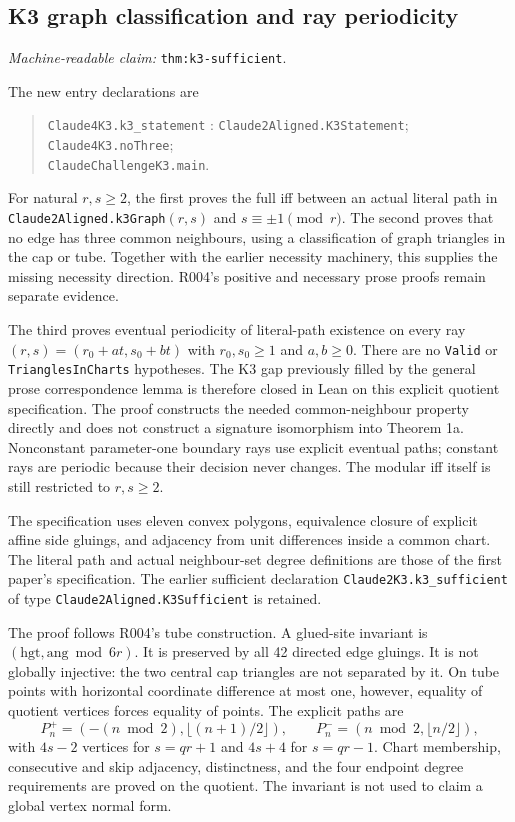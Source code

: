\documentclass[11pt]{amsart}
\newcommand{\record}[1]{\nolinkurl{#1}}
\newcommand{\claimid}[1]{\par\nopagebreak\noindent\textit{Machine-readable claim:} \record{#1}.\par}
\theoremstyle{definition}\newtheorem{definition}{Definition}
\begin{document}
\subsection{K3 graph classification and ray periodicity}\label{thm:k3-sufficient}
\claimid{thm:k3-sufficient}
The new entry declarations are
\begin{quote}\small\noindent
\record{Claude4K3.k3_statement} : \record{Claude2Aligned.K3Statement};\\
\record{Claude4K3.noThree};\\
\record{ClaudeChallengeK3.main}.
\end{quote}
For natural $r,s\ge2$, the first proves the full iff between an actual
literal path in \record{Claude2Aligned.k3Graph}$(r,s)$ and
$s\equiv\pm1\pmod r$. The second proves that no edge has three common
neighbours, using a classification of graph triangles in the cap or tube.
Together with the earlier necessity machinery, this supplies the missing
necessity direction. R004's positive and necessary prose proofs remain
separate evidence.

The third proves eventual periodicity of literal-path existence on every
ray $(r,s)=(r_0+at,s_0+bt)$ with $r_0,s_0\ge1$ and $a,b\ge0$.
There are no \record{Valid} or \record{TrianglesInCharts} hypotheses.
The K3 gap previously filled by the general prose correspondence lemma is
therefore closed in Lean on this explicit quotient specification. The
proof constructs the needed common-neighbour property directly and does
not construct a signature isomorphism into Theorem 1a.
Nonconstant parameter-one boundary rays use explicit eventual paths;
constant rays are periodic because their decision never changes. The
modular iff itself is still restricted to $r,s\ge2$.

The specification uses eleven convex polygons, equivalence closure of
explicit affine side gluings, and adjacency from unit differences inside
a common chart. The literal path and actual neighbour-set degree
 definitions are those of the first paper's specification.
The earlier sufficient declaration \record{Claude2K3.k3_sufficient}
of type \record{Claude2Aligned.K3Sufficient} is retained.

The proof follows R004's tube construction. A glued-site invariant
is $(\mathrm{hgt},\mathrm{ang}\bmod6r)$. It is preserved by all
42 directed edge gluings. It is not globally injective: the two
central cap triangles are not separated by it. On tube points with
horizontal coordinate difference at most one, however, equality of
quotient vertices forces equality of points. The explicit paths are
\[
 P_n^+=(-(n\bmod2),\lfloor(n+1)/2\rfloor),\qquad
 P_n^-= (n\bmod2,\lfloor n/2\rfloor),
\]
with $4s-2$ vertices for $s=qr+1$ and $4s+4$ for $s=qr-1$.
Chart membership, consecutive and skip adjacency, distinctness, and
the four endpoint degree requirements are proved on the quotient.
The invariant is not used to claim a global vertex normal form.
\end{document}
